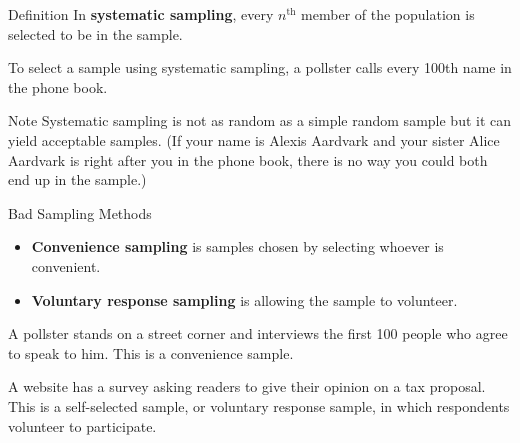 \documentclass{beamer}
\begin{document}
\begin{frame}
\begin{block}{Definition}
In \textbf{systematic sampling}, every $n^{\text{th}}$ member of the population is selected to be in the sample.
\end{block}\pause

\begin{example}
To select a sample using systematic sampling, a pollster calls every 100th name in the phone book.
\end{example}\pause

\begin{block}{Note}
Systematic sampling is not as random as a simple random sample but it can yield acceptable samples. (If your name is Alexis Aardvark and your sister Alice Aardvark is right after you in the phone book, there is no way you could both end up in the sample.) 
\end{block}
\end{frame}

\begin{frame}
\begin{block}{Bad Sampling Methods}
\begin{itemize}
\item \textbf{Convenience sampling} is samples chosen by selecting whoever is convenient.
\item \textbf{Voluntary response sampling} is allowing the sample to volunteer.
\end{itemize}
\end{block}\pause

\begin{example}
A pollster stands on a street corner and interviews the first 100 people who agree to speak to him. This is a convenience sample.
\end{example}\pause

\begin{example}
A website has a survey asking readers to give their opinion on a tax proposal. This is a self-selected sample, or voluntary response sample, in which respondents volunteer to participate.
\end{example}
\end{frame}
\end{document}

